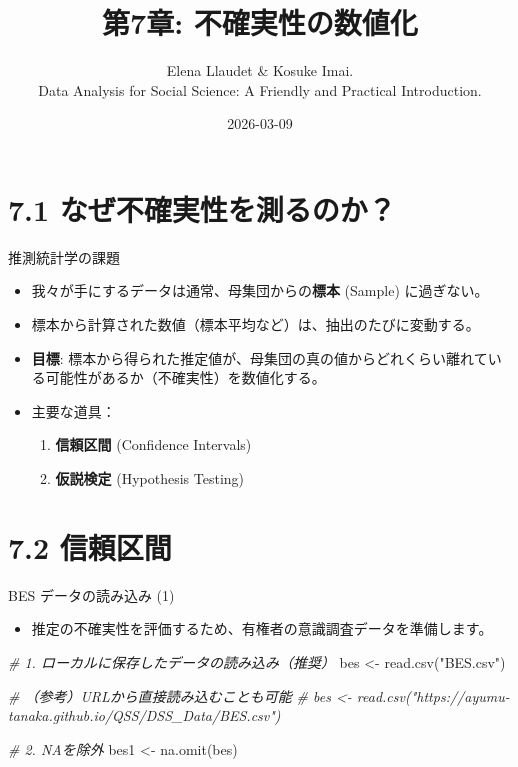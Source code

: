 \documentclass[
  ignorenonframetext,
]{beamer}
\title{第7章: 不確実性の数値化}
\subtitle{Elena Llaudet \& Kosuke Imai.\\
Data Analysis for Social Science: A Friendly and Practical
Introduction.}
\author{}
\date{\vspace{-2.5em}2026-03-09}
\newenvironment{Shaded}{\begin{snugshade}}{\end{snugshade}}
\newcommand{\CommentTok}[1]{\textcolor[rgb]{0.56,0.35,0.01}{\textit{#1}}}
\newcommand{\FunctionTok}[1]{\textcolor[rgb]{0.00,0.00,0.00}{#1}}
\newcommand{\NormalTok}[1]{#1}
\newcommand{\OtherTok}[1]{\textcolor[rgb]{0.56,0.35,0.01}{#1}}
\newcommand{\StringTok}[1]{\textcolor[rgb]{0.31,0.60,0.02}{#1}}
\providecommand{\tightlist}{%
  \setlength{\itemsep}{0pt}\setlength{\parskip}{0pt}}
\begin{document}
\frame{\titlepage}

\hypertarget{ux306aux305cux4e0dux78baux5b9fux6027ux3092ux6e2cux308bux306eux304b}{%
\section{7.1
なぜ不確実性を測るのか？}\label{ux306aux305cux4e0dux78baux5b9fux6027ux3092ux6e2cux308bux306eux304b}}

\begin{frame}{推測統計学の課題}
\protect\hypertarget{ux63a8ux6e2cux7d71ux8a08ux5b66ux306eux8ab2ux984c}{}
\begin{itemize}
\tightlist
\item
  我々が手にするデータは通常、母集団からの\textbf{標本} (Sample)
  に過ぎない。
\item
  標本から計算された数値（標本平均など）は、抽出のたびに変動する。
\item
  \textbf{目標}:
  標本から得られた推定値が、母集団の真の値からどれくらい離れている可能性があるか（不確実性）を数値化する。
\item
  主要な道具：

  \begin{enumerate}
  \tightlist
  \item
    \textbf{信頼区間} (Confidence Intervals)
  \item
    \textbf{仮説検定} (Hypothesis Testing)
  \end{enumerate}
\end{itemize}
\end{frame}

\hypertarget{ux4fe1ux983cux533aux9593}{%
\section{7.2 信頼区間}\label{ux4fe1ux983cux533aux9593}}

\begin{frame}[fragile]{BES データの読み込み (1)}
\protect\hypertarget{bes-ux30c7ux30fcux30bfux306eux8aadux307fux8fbcux307f-1}{}
\begin{itemize}
\tightlist
\item
  推定の不確実性を評価するため、有権者の意識調査データを準備します。
\end{itemize}

\scriptsize

\begin{Shaded}
\begin{Highlighting}[]
\CommentTok{\# 1. ローカルに保存したデータの読み込み（推奨）}
\NormalTok{bes }\OtherTok{\textless{}{-}} \FunctionTok{read.csv}\NormalTok{(}\StringTok{"BES.csv"}\NormalTok{)}

\CommentTok{\# （参考）URLから直接読み込むことも可能}
\CommentTok{\# bes \textless{}{-} read.csv("https://ayumu{-}tanaka.github.io/QSS/DSS\_Data/BES.csv")}

\CommentTok{\# 2. NAを除外}
\NormalTok{bes1 }\OtherTok{\textless{}{-}} \FunctionTok{na.omit}\NormalTok{(bes)}
\end{Highlighting}
\end{Shaded}

\normalsize
\end{frame}
\end{document}
